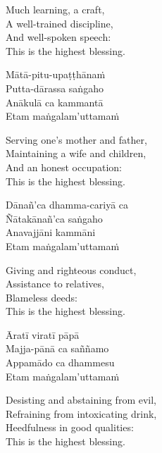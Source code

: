 \begin{english-verses}
  Much learning, a craft,\\
  A well-trained discipline,\\
  And well-spoken speech:\\
  This is the highest blessing.
\end{english-verses}

\begin{pali-hang-continued}
  Mātā-pitu-upaṭṭhānaṁ\\
  Putta-dārassa saṅgaho\\
  Anākulā ca kammantā\\
  Etam maṅgalam'uttamaṁ
\end{pali-hang-continued}

\begin{english-verses}
  Serving one's mother and father,\\
  Maintaining a wife and children,\\
  And an honest occupation:\\
  This is the highest blessing.
\end{english-verses}

\begin{pali-hang-continued}
  Dānañ'ca dhamma-cariyā ca\\
  Ñātakānañ'ca saṅgaho\\
  Anavajjāni kammāni\\
  Etam maṅgalam'uttamaṁ
\end{pali-hang-continued}

\begin{english-verses}
  Giving and righteous conduct,\\
  Assistance to relatives,\\
  Blameless deeds:\\
  This is the highest blessing.
\end{english-verses}

\begin{pali-hang-continued}
  Āratī viratī pāpā\\
  Majja-pānā ca saññamo\\
  Appamādo ca dhammesu\\
  Etam maṅgalam'uttamaṁ
\end{pali-hang-continued}

\begin{english-verses}
  Desisting and abstaining from evil,\\
  Refraining from intoxicating drink,\\
  Heedfulness in good qualities:\\
  This is the highest blessing.
\end{english-verses}

